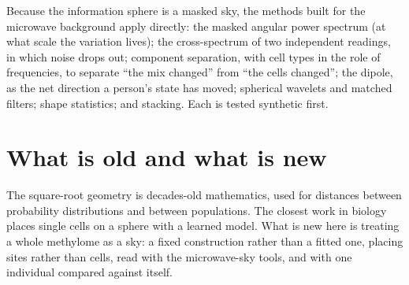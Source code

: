 Because the information sphere is a masked sky, the methods built for the microwave background apply directly: the masked angular power
spectrum (at what scale the variation lives); the cross-spectrum of two independent readings, in which noise drops out; component
separation, with cell types in the role of frequencies, to separate ``the mix changed'' from ``the cells changed''; the dipole, as the net
direction a person's state has moved; spherical wavelets and matched filters; shape statistics; and stacking. Each is tested synthetic
first.

\section{What is old and what is new}

The square-root geometry is decades-old mathematics, used for distances between probability distributions and between populations. The
closest work in biology places single cells on a sphere with a learned model. What is new here is treating a whole methylome as a sky: a
fixed construction rather than a fitted one, placing sites rather than cells, read with the microwave-sky tools, and with one individual
compared against itself.
